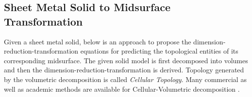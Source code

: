 %
%


\subsection{Sheet Metal Solid to Midsurface Transformation}

Given a sheet metal solid, below is an approach to propose the dimension-reduction-transformation equations for predicting the topological entities of its corresponding midsurface. The given solid model is first decomposed into volumes and then the dimension-reduction-transformation is derived. Topology generated by the volumetric decomposition is called {\em Cellular Topology}.  Many commercial as well as academic methods are available for Cellular-Volumetric decomposition \cite{Woo2002, Woo2003, Chong2004, Cao2011,  Boussuge2013,  Boussuge2013a, Kim2014}. 


